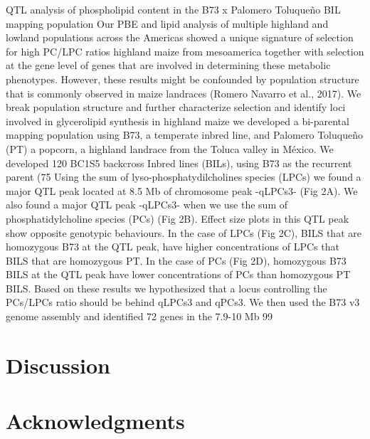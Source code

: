 \documentclass[9pt,twocolumn,twoside,lineno]{gsajnl}
\begin{document}
QTL analysis of phospholipid content in the B73 x Palomero Toluqueño BIL mapping population
Our PBE and lipid analysis of multiple highland and lowland populations across the Americas showed a unique signature of selection for high PC/LPC ratios highland maize from mesoamerica together with selection at the gene level of genes that are involved in determining these metabolic phenotypes. However, these results might be confounded by population structure that is commonly observed in maize landraces (Romero Navarro et al., 2017). We break population structure and further characterize selection and identify loci involved in glycerolipid synthesis in highland maize we developed a bi-parental mapping population using B73, a temperate inbred line, and Palomero Toluqueño (PT) a popcorn, a highland landrace from the Toluca valley in México. We developed 120 BC1S5 backcross Inbred  lines (BILs), using B73 as the recurrent parent (75%
Using the sum of lyso-phosphatydilcholines species (LPCs) we found a major QTL peak located at 8.5 Mb of chromosome peak -qLPCs3- (Fig 2A). We also found a major QTL peak -qLPCs3- when we use the sum of phosphatidylcholine species (PCs) (Fig 2B). Effect size plots in this QTL peak show opposite genotypic behaviours. In the case of LPCs (Fig 2C), BILS that are homozygous B73 at the QTL peak, have higher concentrations of LPCs that BILS that are homozygous PT. In the case of PCs (Fig 2D), homozygous B73 BILS at the QTL peak have lower concentrations of PCs than homozygous PT BILS. Based on these results we hypothesized that a locus controlling the PCs/LPCs ratio should be behind  qLPCs3 and qPCs3. We then used the B73 v3 genome assembly and identified 72 genes in the 7.9-10 Mb 99%

\section{Discussion}
\label{sec:discusion}

\section{Acknowledgments}
\label{sec:acknowledgments}


\end{document}
